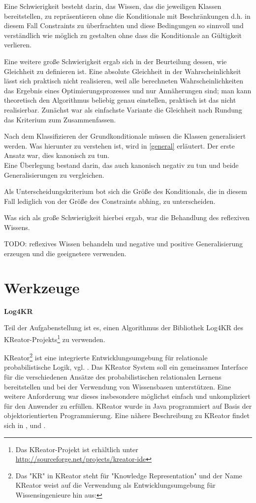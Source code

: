 \documentclass[a4paper, 11pt]{book}
\begin{document}
Eine Schwierigkeit besteht darin, das Wissen, das die jeweiligen Klassen bereitstellen, zu repräsentieren ohne die Konditionale mit Beschränkungen d.h. in diesem Fall Constraints zu überfrachten und diese Bedingungen so sinnvoll und verständlich wie möglich zu gestalten ohne dass die Konditionale an Gültigkeit verlieren.

Eine weitere große Schwierigkeit ergab sich in der Beurteilung dessen, wie Gleichheit zu definieren ist. Eine absolute Gleichheit in der Wahrscheinlichkeit lässt sich praktisch nicht realisieren, weil alle berechneten Wahrscheinlichkeiten das Ergebnis eines Optimierungsprozesses und nur Annäherungen sind; man kann theoretisch den Algorithmus beliebig genau einstellen, praktisch ist das nicht realisierbar. Zunächst war als einfachste Variante die Gleichheit nach Rundung das Kriterium zum Zusammenfassen.

Nach dem Klassifizieren der Grundkonditionale müssen die Klassen generalisiert werden. Was hierunter zu verstehen ist, wird in \ref{general} erläutert. 
Der erste Ansatz war, dies kanonisch zu tun.\\
Eine Überlegung bestand darin, das auch kanonisch negativ zu tun und beide Generalisierungen zu vergleichen.

Als Unterscheidungskriterium bot sich die Größe des Konditionals, die in diesem Fall lediglich von der Größe des Constraints abhing, zu unterscheiden.

Was sich als große Schwierigkeit hierbei ergab, war die Behandlung des reflexiven Wissens.

TODO:
reflexives Wissen behandeln und negative und positive Generalisierung erzeugen und die geeignetere verwenden.




\section{Werkzeuge}

\textbf{Log4KR}

Teil der Aufgabenstellung ist es, einen Algorithmus der Bibliothek Log4KR des KReator-Projekts\footnote{Das KReator-Projekt ist erhältlich unter \href{http://sourceforge.net/projects/kreator-ide}{http://sourceforge.net/projects/kreator-ide}} zu verwenden.

KReator\footnote{Das "{}KR"{} in KReator steht für "{}Knowledge Representation"{} und der Name KReator weist auf die Verwendung als Entwicklungsumgebung für Wissensingenieure hin aus:\cite{FLT09}} ist eine integrierte Entwicklungsumgebung für relationale probabilistische Logik, vgl. \cite{BHM14}. Das KReator System soll ein gemeinsames Interface für die verschiedenen Ansätze des probabilistischen relationalen Lernens bereitstellen und bei der Verwendung von Wissensbasen unterstützen. Eine weitere Anforderung war dieses insbesondere möglichst einfach und unkompliziert für den Anwender zu erfüllen. KReator wurde in Java programmiert auf Basis der objektorientierten Programmierung. Eine nähere Beschreibung zu KReator findet sich in \cite{TFLKIB10}, \cite{KIBFT11} und \cite{FLT09}.
\end{document}
